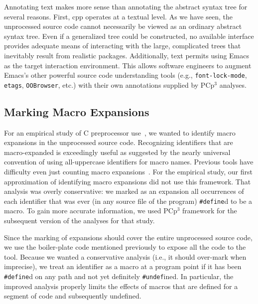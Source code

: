 \documentclass{article}
\newcommand{\pcp}{\mbox{\textsf{PCp}$^3$}}
\newcommand{\Cpp}{\mbox{\textsf{cpp}}}
\newcommand{\C}{\mbox{C}}
\newcommand{\ppd}[1]{\texttt{\##1}}
\newcommand{\sectionref}[1]{section \ref{#1}, on page \pageref{#1}}
\newcommand{\ie}{i.e.,}
\newcommand{\eg}{e.g.,}
\newcommand{\etc}{etc}  %
\begin{document}
Annotating text makes more sense than annotating the abstract syntax
tree for several reasons.  First, \Cpp{} operates at a textual level.
As we have seen, the unprocessed source code cannot necessarily be
viewed as an ordinary abstract syntax tree.  Even if a generalized tree
could be constructed, no available interface provides adequate means
of interacting with the large, complicated trees that inevitably result
from realistic packages.
Additionally, text permits using Emacs as the target interaction
environment. This allows software engineers to augment Emacs's other
powerful source code understanding tools (\eg{} \texttt{font-lock-mode},
\texttt{etags}, \texttt{OOBrowser}, \etc{}.)  with their own annotations
supplied by \pcp{} analyses.



\subsection*{Marking Macro Expansions}
\label{ssec:mark_macros}
\nopagebreak

For an empirical study of \C{} preprocessor use~\cite{EmpCpp-TR}, we
wanted to identify macro expansions in the unprocessed source code.
Recognizing identifiers that are macro-expanded is exceedingly useful as
suggested by the nearly universal convention of using all-uppercase
identifiers for macro names.  Previous tools have difficulty even just
counting macro expansions~\cite{Griswold96}.  For the empirical study,
our first approximation of identifying macro expansions did not use this
framework.  That analysis was overly conservative: we marked as an
expansion all occurrences of each identifier that was ever
(in any source file of the program) \ppd{define}d to be a macro.
To gain more accurate information, we used \pcp{}
framework for the subsequent version of the analyses for that study.

Since the marking of expansions should cover the entire unprocessed
source code, we use the boiler-plate code mentioned previously
to expose all the code to the tool.  Because we wanted a
conservative analysis (\ie{} it should over-mark when imprecise), we treat an
identifier as a macro at a program point if it has been \ppd{define}d on
any path and not yet definitely \ppd{undef}ined.  In particular, the
improved analysis properly limits the effects of macros that are
defined for a segment of code and subsequently undefined.
\end{document}
